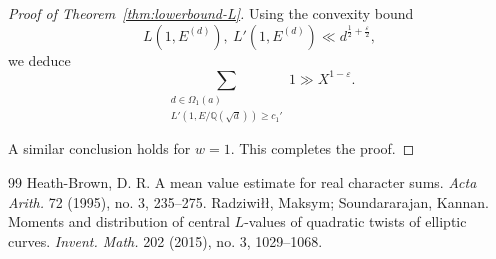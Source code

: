 \documentclass[10pt,a4paper]{amsart}
\begin{document}
\begin{proof}[Proof of Theorem~\ref{thm:lowerbound-L}]
Using the convexity bound
\[
L(1, E^{(d)}),~ L'(1, E^{(d)})
\ll d^{\frac{1}{2} + \frac{\varepsilon}{2}},
\]
we deduce
\[
\sum_{\substack{d \in \Omega_1(a) \\ L'(1, E/\mathbb{Q}(\sqrt{d})) \geq c_1'}} 1
\gg X^{1 - \varepsilon}.
\]

A similar conclusion holds for \( w = 1 \). This completes the proof.
\end{proof}

\begin{thebibliography}{99}
 Heath-Brown, D. R. A mean value estimate for real character sums. \emph{Acta Arith.} 72 (1995), no. 3, 235--275. %
 Radziwi\l\l, Maksym; Soundararajan, Kannan. Moments and distribution of central $L$-values of quadratic twists of elliptic curves. \emph{Invent. Math.} 202 (2015), no. 3, 1029--1068.
\end{thebibliography}
\end{document}
